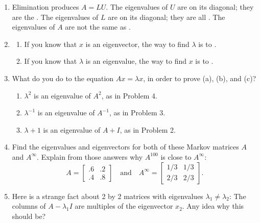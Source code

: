 \documentclass[14pt, a4paper]{article}
\begin{document}
\begin{enumerate}
    \item Elimination produces $A = LU$. The eigenvalues of $U$ are on its diagonal; they are the \underline{\hspace{1cm}} . The eigenvalues of $L$ are on its diagonal; they are all \underline{\hspace{1cm}} . The eigenvalues of $A$ are not the same as \underline{\hspace{1cm}} .

    \item
          \begin{enumerate}
              \item If you know that $x$ is an eigenvector, the way to find $\lambda$ is to \underline{\hspace{1cm}} .
              \item If you know that $\lambda$ is an eigenvalue, the way to find $x$ is to \underline{\hspace{1cm}} .
          \end{enumerate}

    \item What do you do to the equation $Ax = \lambda x$, in order to prove (a), (b), and (c)?
          \begin{enumerate}
              \item $\lambda^2$ is an eigenvalue of $A^2$, as in Problem 4.
              \item $\lambda^{-1}$ is an eigenvalue of $A^{-1}$, as in Problem 3.
              \item $\lambda + 1$ is an eigenvalue of $A + I$, as in Problem 2.
          \end{enumerate}

    \item Find the eigenvalues and eigenvectors for both of these Markov matrices $A$ and $A^{\infty}$. Explain from those answers why $A^{100}$ is close to $A^{\infty}$:
          \[
              A = \begin{bmatrix} .6 & .2 \\ .4 & .8 \end{bmatrix} \quad \text{and} \quad A^{\infty} = \begin{bmatrix} 1/3 & 1/3 \\ 2/3 & 2/3 \end{bmatrix} .
          \]

    \item Here is a strange fact about 2 by 2 matrices with eigenvalues $\lambda_1 \neq \lambda_2$: The columns of $A - \lambda_1 I$ are multiples of the eigenvector $x_2$. Any idea why this should be?


\end{enumerate}
\end{document}
